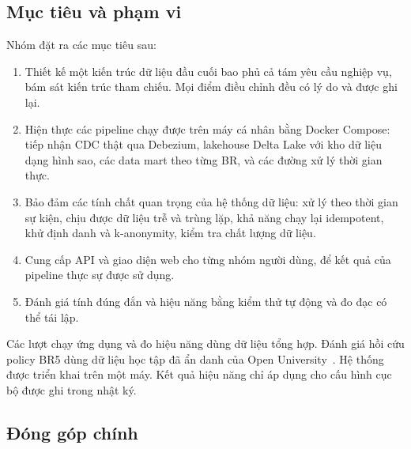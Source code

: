 \subsection{Mục tiêu và phạm vi}

Nhóm đặt ra các mục tiêu sau:
\begin{enumerate}
  \item Thiết kế một kiến trúc dữ liệu đầu cuối bao phủ cả tám yêu cầu nghiệp vụ, bám sát kiến trúc tham chiếu. Mọi điểm điều chỉnh đều có lý do và được ghi lại.
  \item Hiện thực các pipeline chạy được trên máy cá nhân bằng Docker Compose: tiếp nhận CDC thật qua Debezium, lakehouse Delta Lake với kho dữ liệu dạng hình sao, các data mart theo từng BR, và các đường xử lý thời gian thực.
  \item Bảo đảm các tính chất quan trọng của hệ thống dữ liệu: xử lý theo thời gian sự kiện, chịu được dữ liệu trễ và trùng lặp, khả năng chạy lại idempotent, khử định danh và k-anonymity, kiểm tra chất lượng dữ liệu.
  \item Cung cấp API và giao diện web cho từng nhóm người dùng, để kết quả của pipeline thực sự được sử dụng.
  \item Đánh giá tính đúng đắn và hiệu năng bằng kiểm thử tự động và đo đạc có thể tái lập.
\end{enumerate}

Các lượt chạy ứng dụng và đo hiệu năng dùng dữ liệu tổng hợp. Đánh giá hồi cứu policy BR5 dùng dữ liệu học tập đã ẩn danh của Open University~\cite{kuzilek2017oulad}. Hệ thống được triển khai trên một máy. Kết quả hiệu năng chỉ áp dụng cho cấu hình cục bộ được ghi trong nhật ký.

\subsection{Đóng góp chính}

